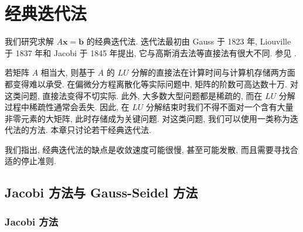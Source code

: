 \chapter{经典迭代法}
\label{ch:iterative}

我们研究求解 $A\mathbf{x}=\mathbf{b}$ 的经典迭代法. 迭代法最初由 Gauss 于 1823 年, Liouville 于 1837 年和 Jacobi 于 1845 年提出, 它与高斯消去法等直接法有很大不同. 参见 \cite{src:2}.

若矩阵 $A$ 相当大, 则基于 $A$ 的 $LU$ 分解的直接法在计算时间与计算机存储两方面都变得难以承受. 在偏微分方程离散化等实际问题中, 矩阵的阶数可高达数十万. 对这类问题, 直接法变得不切实际. 此外, 大多数大型问题都是稀疏的, 而在 $LU$ 分解过程中稀疏性通常会丢失. 因此, 在 $LU$ 分解结束时我们不得不面对一个含有大量非零元素的大矩阵, 此时存储成为关键问题. 对这类问题, 我们可以使用一类称为迭代法的方法. 本章只讨论若干经典迭代法.

我们指出, 经典迭代法的缺点是收敛速度可能很慢, 甚至可能发散, 而且需要寻找合适的停止准则.

\section{Jacobi 方法与 Gauss-Seidel 方法}
\label{sec:5-1}

\subsection{Jacobi 方法}
\label{subsec:5-1-1}

